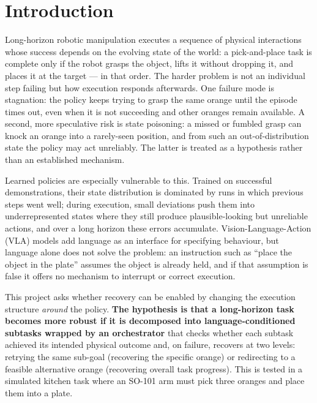 \section{Introduction}
\label{sec:introduction}

Long-horizon robotic manipulation executes a sequence of physical interactions whose success depends on the evolving state of the world: a pick-and-place task is complete only if the robot grasps the object, lifts it without dropping it, and places it at the target --- in that order. The harder problem is not an individual step failing but how execution responds afterwards. One failure mode is stagnation: the policy keeps trying to grasp the same orange until the episode times out, even when it is not succeeding and other oranges remain available. A second, more speculative risk is state poisoning: a missed or fumbled grasp can knock an orange into a rarely-seen position, and from such an out-of-distribution state the policy may act unreliably. The latter is treated as a hypothesis rather than an established mechanism.

Learned policies are especially vulnerable to this. Trained on successful demonstrations, their state distribution is dominated by runs in which previous steps went well; during execution, small deviations push them into underrepresented states where they still produce plausible-looking but unreliable actions, and over a long horizon these errors accumulate. Vision-Language-Action (VLA) models add language as an interface for specifying behaviour, but language alone does not solve the problem: an instruction such as ``place the object in the plate'' assumes the object is already held, and if that assumption is false it offers no mechanism to interrupt or correct execution.

This project asks whether recovery can be enabled by changing the execution structure \emph{around} the policy. \textbf{The hypothesis is that a long-horizon task becomes more robust if it is decomposed into language-conditioned subtasks wrapped by an orchestrator} that checks whether each subtask achieved its intended physical outcome and, on failure, recovers at two levels: retrying the same sub-goal (recovering the specific orange) or redirecting to a feasible alternative orange (recovering overall task progress). This is tested in a simulated kitchen task where an SO-101 arm must pick three oranges and place them into a plate.

